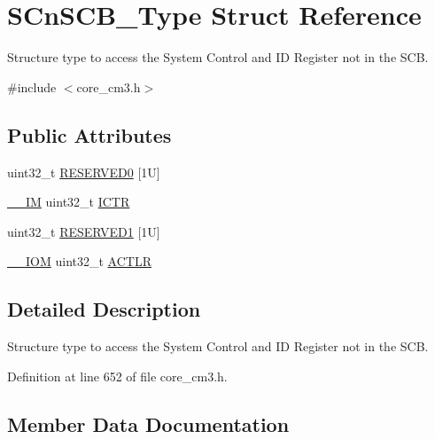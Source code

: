 \hypertarget{struct_s_cn_s_c_b___type}{}\section{S\+Cn\+S\+C\+B\+\_\+\+Type Struct Reference}
\label{struct_s_cn_s_c_b___type}


Structure type to access the System Control and ID Register not in the S\+CB.  




{\ttfamily \#include $<$core\+\_\+cm3.\+h$>$}

\subsection*{Public Attributes}
\begin{DoxyCompactItemize}
\item 
uint32\+\_\+t \hyperlink{struct_s_cn_s_c_b___type_a758b3cae751b227e20698256b6249dd4}{R\+E\+S\+E\+R\+V\+E\+D0} \mbox{[}1\+U\mbox{]}
\item 
\hyperlink{core__sc300_8h_a4cc1649793116d7c2d8afce7a4ffce43}{\+\_\+\+\_\+\+IM} uint32\+\_\+t \hyperlink{struct_s_cn_s_c_b___type_a34ec1d771245eb9bd0e3ec9336949762}{I\+C\+TR}
\item 
uint32\+\_\+t \hyperlink{struct_s_cn_s_c_b___type_a0bce3f86e9f6e00085cf5a126ae201c6}{R\+E\+S\+E\+R\+V\+E\+D1} \mbox{[}1\+U\mbox{]}
\item 
\hyperlink{core__sc300_8h_ab6caba5853a60a17e8e04499b52bf691}{\+\_\+\+\_\+\+I\+OM} uint32\+\_\+t \hyperlink{struct_s_cn_s_c_b___type_a13af9b718dde7481f1c0344f00593c23}{A\+C\+T\+LR}
\end{DoxyCompactItemize}


\subsection{Detailed Description}
Structure type to access the System Control and ID Register not in the S\+CB. 

Definition at line 652 of file core\+\_\+cm3.\+h.



\subsection{Member Data Documentation}
\mbox{\label{struct_s_cn_s_c_b___type_a13af9b718dde7481f1c0344f00593c23}} 
